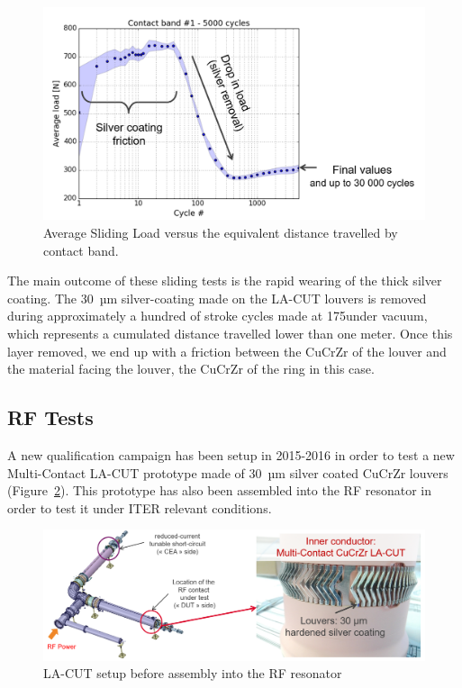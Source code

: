 {\begin{figure}[h]
	\centering
	\includegraphics[width=1.0\linewidth]{figures/chap3/RF_contacts/RF_contact_LACUT_sliding_tests_results}
	\caption{Average Sliding Load versus the equivalent distance travelled by contact band.}
	\label{fig:rfcontactlacutslidingtestsresults}
\end{figure}

The main outcome of these sliding tests is the rapid wearing of the thick silver coating. The 30~µm silver-coating made on the LA-CUT louvers is removed during approximately a hundred of stroke cycles made at 175\degC under vacuum, which represents a cumulated distance travelled lower than one meter. Once this layer removed, we end up with a friction between the CuCrZr of the louver and the material facing the louver, the CuCrZr of the ring in this case. 

\subsection{RF Tests}
A new qualification campaign has been setup in 2015-2016 in order to test a new Multi-Contact LA-CUT prototype made of 30~µm silver coated CuCrZr louvers (Figure~\ref{fig:rfcontactlacuttest}). This prototype has also been assembled into the RF resonator in order to test it under ITER relevant conditions. 

\begin{figure}[h]
	\centering
	\includegraphics[width=1.0\linewidth]{figures/chap3/RF_contacts/RF_contact_LACUT_test}
	\caption{LA-CUT setup before assembly into the RF resonator}
	\label{fig:rfcontactlacuttest}
\end{figure}

}
